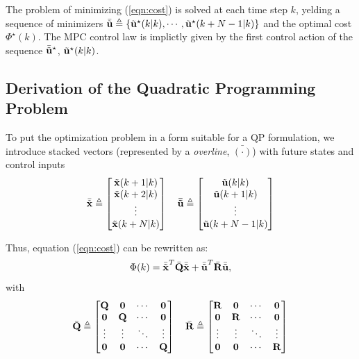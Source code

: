 \documentclass[conference]{IEEEtran} %
\begin{document}
The problem of minimizing (\ref{eqn:cost}) is solved at each time step $k$, yelding a sequence of minimizers ${\bar{\tilde{\bf u}}}\triangleq\{\tilde{\bf u}^\star(k|k),\cdots,\tilde{\bf u}^\star(k+N-1|k)\}$ and the optimal cost $\Phi^\star(k)$. The MPC control law is implictly given by the first control action of the sequence $\bar{\tilde{\bf u}}^\star$, $\tilde{\bf u}^\star(k|k)$.


\subsection{Derivation of the Quadratic Programming Problem}
\label{sec:qp}

To put the optimization problem in a form suitable for a QP formulation, we introduce stacked vectors (represented by a {\em overline}, $\bar{(\cdot)}$) with future states and control inputs
\begin{equation*}
	\bar{\tilde{\bf x}} \triangleq \begin{bmatrix}
		\tilde{\bf x}(k+1|k) \\ \tilde{\bf x}(k+2|k) \\ \vdots \\ \tilde{\bf x}(k+N|k) 
	\end{bmatrix} \quad
	\bar{\tilde{\bf u}} \triangleq \begin{bmatrix}
		\tilde{\bf u}(k|k)  \\ \tilde{\bf u}(k+1|k) \\ \vdots \\ \tilde{\bf u}(k+N-1|k)
	\end{bmatrix}
\end{equation*}

Thus, equation (\ref{eqn:cost}) can be rewritten as:
\begin{equation}\label{eqn:cost2}
	\Phi(k) = {\bar{\tilde{\bf x}}}^T\bar{\bf Q}{\bar{\tilde{\bf x}}} + {\bar{\tilde{\bf u}}}^T\bar{\bf R}{\bar{\tilde{\bf u}}},
\end{equation}
with
\begin{equation*}
	\bar {\bf Q} \triangleq \begin{bmatrix}
		{\bf Q} & {\bf 0} & \cdots & {\bf 0} \\
		{\bf 0} & {\bf Q} & \cdots & {\bf 0} \\
		\vdots  & \vdots  & \ddots & \vdots  \\
		{\bf 0} & {\bf 0} & \cdots & {\bf Q}
	\end{bmatrix} \quad
	\bar {\bf R} \triangleq \begin{bmatrix}
		{\bf R} & {\bf 0} & \cdots & {\bf 0} \\
		{\bf 0} & {\bf R} & \cdots & {\bf 0} \\
		\vdots  & \vdots  & \ddots & \vdots  \\
		{\bf 0} & {\bf 0} & \cdots & {\bf R}
	\end{bmatrix}
\end{equation*}
\end{document}

